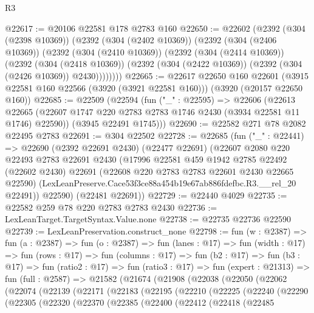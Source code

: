 \begin{lexlean}{R3}
\begin{coremodule}
@22617 := @20106 @22581 @178 @2783 @160
@22650 := @22602
    (@2392
      (@304 (@2398 @10369))
      (@2392
        (@304 (@2402 @10369))
        (@2392
          (@304 (@2406 @10369))
          (@2392
            (@304 (@2410 @10369))
            (@2392
              (@304 (@2414 @10369))
              (@2392
                (@304 (@2418 @10369))
                (@2392 (@304 (@2422 @10369)) (@2392 (@304 (@2426 @10369)) @2430))))))))
@22665 := @22617
    @22650
    @160
    @22601
    (@3915 @22581 @160 @22566 (@3920 (@3921 @22581 @160)))
    (@3920 (@20157 @22650 @160))
@22685 := @22509
    (@22594
      (fun ("_" : @22595) =>
      @22606
        (@22613 @22665 (@22607 @1747 @220 @2783 @2783 @1746 @2430 (@3934 @22581 @11 @1746) @22590))
        (@3945 @22491 @1745)))
@22690 := @22582 @271 @78 @2082 @22495 @2783
@22691 := @304 @22502
@22728 := @22685
    (fun ("_" : @22441) =>
    @22690
      (@2392 @22691 @2430)
      (@22477 @22691)
      (@22607
        @2080
        @220
        @22493
        @2783
        @22691
        @2430
        (@17996
          @22581
          @459
          @1942
          @2785
          @22492
          (@22602 @2430)
          @22691
          (@22608 @220 @2783 @2783 @22601 @2430 @22665 @22590)
          (LexLeanPreserve.Cace53f3ce88a454b19e67ab886fdefbc.R3.__rel_20 @22491))
        @22590)
      (@22481 @22691))
@22729 := @22440 @4029
@22735 := @22582 @259 @78 @220 @2783 @2783 @2430
@22736 := LexLeanTarget.TargetSyntax.Value.none
@22738 := @22735 @22736 @22590
@22739 := LexLeanPreservation.construct_none
@22798 := fun (w : @2387) =>
  fun (a : @2387) =>
  fun (o : @2387) =>
  fun (lanes : @17) =>
  fun (width : @17) =>
  fun (rows : @17) =>
  fun (columns : @17) =>
  fun (b2 : @17) =>
  fun (b3 : @17) =>
  fun (ratio2 : @17) =>
  fun (ratio3 : @17) =>
  fun (expert : @21313) =>
  fun (full : @2587) =>
  @21582
    (@21674
      (@21908
        (@22038
          (@22050
            (@22062
              (@22074
                (@22139
                  (@22171
                    (@22183
                      (@22195
                        (@22210
                          (@22225
                            (@22240
                              (@22290
                                (@22305
                                  (@22320
                                    (@22370
                                      (@22385
                                        (@22400
                                          (@22412
                                            (@22418
                                              (@22485

\end{coremodule}
\end{lexlean}
